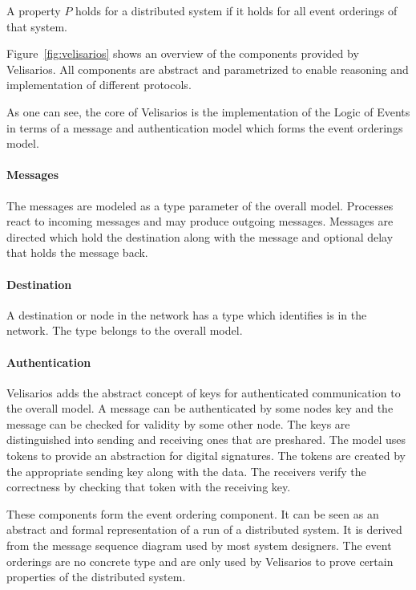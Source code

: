 \begin{defi}
  A property $P$ holds for a distributed system if it holds
  for all event orderings of that system.
\end{defi}

Figure~\ref{fig:velisarios} shows an overview of the components provided
by Velisarios. All components are abstract and parametrized to enable
reasoning and implementation of different protocols.~\cite{rahli2018velisarios}

As one can see, the core of Velisarios is the implementation of the Logic of
Events in terms of a message and authentication model which forms
the event orderings model.~\cite{rahli2018velisarios}

\paragraph*{Messages}
The messages are modeled as a type parameter  of the overall model.
Processes react to incoming messages and may produce outgoing messages.
Messages are directed which hold the destination along with
the message and optional delay that holds the message back.~\cite{rahli2018velisarios}

\paragraph*{Destination}
A destination or node in the network has a type  which
identifies is in the network. The type belongs to the overall model.~\cite{rahli2018velisarios}

\paragraph*{Authentication}
Velisarios adds the abstract concept of keys for authenticated communication
to the overall model. A message can be authenticated by some nodes key
and the message can be checked for validity by some other node. The keys
are distinguished into sending and receiving ones that are preshared.
The model uses tokens to provide an abstraction for digital signatures.
The tokens are created by the appropriate sending key along with the data.
The receivers verify the correctness by checking that token with the receiving
key.~\cite{rahli2018velisarios}

These components form the event ordering component. It can be seen
as an abstract and formal representation of a run of a distributed system.
It is derived from the message sequence diagram used by most system designers.
The event orderings are no concrete type and are only used by Velisarios
to prove certain properties of the distributed system.~\cite{rahli2018velisarios}

